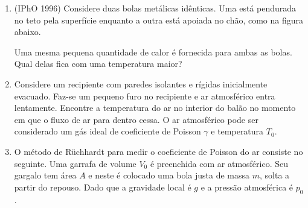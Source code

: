 \begin{enumerate}
    \item
        (IPhO 1996) Considere duas bolas metálicas idênticas. Uma está pendurada
        no teto pela superfície enquanto a outra está apoiada no chão, como na
        figura abaixo.
        \begin{figure}[H]
            \centering
        \end{figure}
        Uma mesma pequena quantidade de calor é fornecida para ambas as bolas.
        Qual delas fica com uma temperatura maior?

    \item
        Considere um recipiente com paredes isolantes e rígidas inicialmente
        evacuado. Faz-se um pequeno furo no recipiente e ar atmosférico entra
        lentamente. Encontre a temperatura do ar no interior do balão no momento
        em que o fluxo de ar para dentro cessa. O ar atmosférico pode ser
        considerado um gás ideal de coeficiente de Poisson $\gamma$ e
        temperatura $T_0$.

    \item
        O método de Rüchhardt para medir o coeficiente de Poisson do ar consiste
        no seguinte. Uma garrafa de volume $V_0$ é preenchida com ar
        atmosférico. Seu gargalo tem área $A$ e neste é colocado uma bola justa
        de massa $m$, solta a partir do repouso. Dado que a gravidade local é
        $g$ e a pressão atmosférica é $p_0$.
        \begin{figure}[H]
            \centering
        \end{figure}


\end{enumerate}
